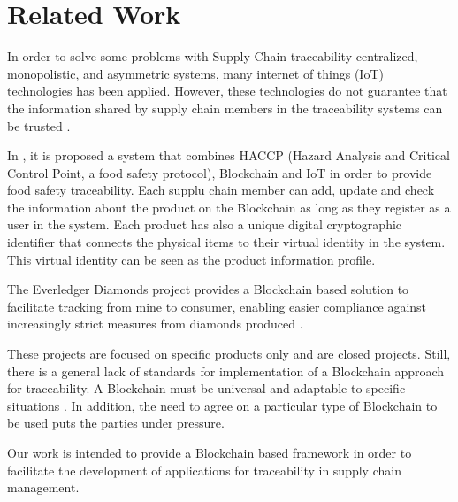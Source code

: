 \section{Related Work} \label{sec:RelatedWork}
In order to solve some problems with Supply Chain traceability centralized, monopolistic, and asymmetric systems, many internet of things (IoT) technologies has been applied. However, these technologies do not guarantee that the information shared by supply chain members in the traceability systems can be trusted \cite{tian2017supply}.

In \cite{tian2017supply}, it is proposed a system that combines HACCP (Hazard Analysis and Critical Control Point, a food safety protocol), Blockchain and IoT in order to provide food safety traceability. Each supplu chain member can add, update and check the information about the product on the Blockchain as long as they register as a user in the system. Each product has also a unique digital cryptographic identifier that connects the physical items to their virtual identity in the system. This virtual identity can be seen as the product information profile.

The Everledger Diamonds project provides a Blockchain based solution to facilitate tracking from mine to consumer, enabling easier compliance against increasingly strict measures from diamonds produced \cite{crosby2016blockchain}.

These projects are focused on specific products only and are closed projects. Still, there is a general lack of standards for implementation of a Blockchain approach for traceability. A Blockchain must be universal and adaptable to specific situations \cite{valenta2017comparison}. In addition, the need to agree on a particular type of Blockchain to be used puts the parties under pressure. 

Our work is intended to provide a Blockchain based framework in order to facilitate the development of applications for traceability in supply chain management.